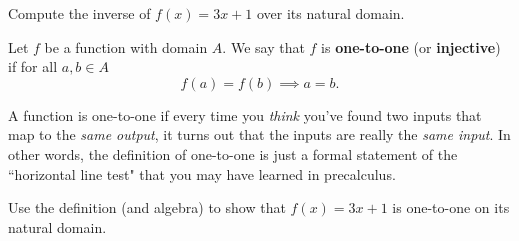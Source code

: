 \newpage

\begin{example}
Compute the inverse of $f(x)=3x+1$ over its natural domain.
\end{example}
\ifdefined\SOLUTION
{}
\else
\fi
\newpage

\begin{definition}
Let $f$ be a function with domain $A$.
We say that $f$ is \textbf{one-to-one} (or \textbf{injective}) if for all $a,b\in A$
\begin{equation*}
f(a)=f(b)\implies a=b.
\end{equation*}
\end{definition}

\begin{remark}
A function is one-to-one if every time you \textit{think} you've found two inputs that map to the \textit{same output}, it turns out that the inputs are really the \textit{same input}.
In other words, the definition of one-to-one is just a formal statement of the ``horizontal line test" that you may have learned in precalculus.
\end{remark}

\begin{example}
Use the definition (and algebra) to show that $f(x)=3x+1$ is one-to-one on its natural domain.
\end{example}

\ifdefined\SOLUTION
{}
\else
\fi
\vfill

